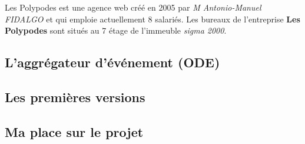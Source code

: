 
Les Polypodes est une agence web créé en 2005 par \textit{M Antonio-Manuel FIDALGO} et qui emploie actuellement 8 salariés. Les bureaux de l'entreprise \textbf{Les Polypodes} sont situés au 7 étage de l'immeuble \textit{sigma 2000}.


\subsection{L'aggrégateur d'événement (ODE)}

\subsection{Les premières versions}

\subsection{Ma place sur le projet}